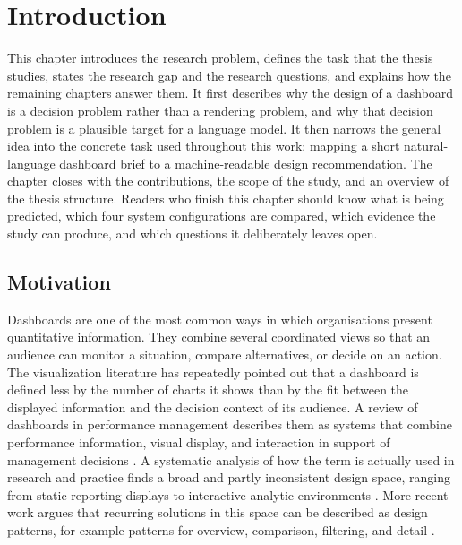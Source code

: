 \chapter{Introduction}

This chapter introduces the research problem, defines the task that the thesis studies, states the research gap and the research questions, and explains how the remaining chapters answer them. It first describes why the design of a dashboard is a decision problem rather than a rendering problem, and why that decision problem is a plausible target for a language model. It then narrows the general idea into the concrete task used throughout this work: mapping a short natural-language dashboard brief to a machine-readable design recommendation. The chapter closes with the contributions, the scope of the study, and an overview of the thesis structure. Readers who finish this chapter should know what is being predicted, which four system configurations are compared, which evidence the study can produce, and which questions it deliberately leaves open.

\section{Motivation}

Dashboards are one of the most common ways in which organisations present quantitative information. They combine several coordinated views so that an audience can monitor a situation, compare alternatives, or decide on an action. The visualization literature has repeatedly pointed out that a dashboard is defined less by the number of charts it shows than by the fit between the displayed information and the decision context of its audience. A review of dashboards in performance management describes them as systems that combine performance information, visual display, and interaction in support of management decisions \cite{yigitbasioglu2012dashboard}. A systematic analysis of how the term is actually used in research and practice finds a broad and partly inconsistent design space, ranging from static reporting displays to interactive analytic environments \cite{sarikaya2019dashboards}. More recent work argues that recurring solutions in this space can be described as design patterns, for example patterns for overview, comparison, filtering, and detail \cite{bach2023dashboardpatterns}.

